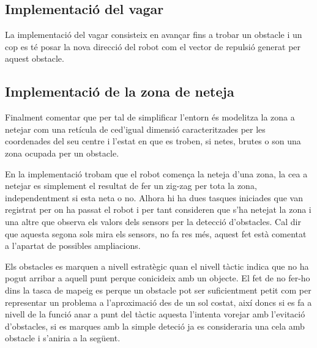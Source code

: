 \subsection{Implementació del vagar}

La implementació del vagar consisteix en avançar fins a trobar un obstacle i un cop es té posar 
la nova direcció del robot com el vector de repulsió generat per aquest obstacle.

\subsection{Implementació de la zona de neteja}

Finalment comentar que per tal de simplificar l'entorn és modelitza la zona a netejar com una retícula
de ce\lgem d'igual dimensió caracteritzades per les coordenades del seu centre i l'estat en que es troben,
si netes, brutes o son una zona ocupada per un obstacle.

En la implementació trobam que el robot comença la neteja d'una zona, la ce\lgem a a netejar es simplement
el resultat de fer un zig-zag per tota la zona, independentment si esta neta o no. Alhora hi ha dues tasques
iniciades que van registrat per on ha passat el robot i per tant consideren que s'ha netejat la zona i una altre
que observa els valors dels sensors per la detecció d'obstacles. Cal dir que aquesta segona sols mira els sensors,
no fa res més, aquest fet està comentat a l'apartat de possibles ampliacions.

Els obstacles es marquen a nivell estratègic quan el nivell tàctic indica que no ha pogut arribar a aquell punt perque conicideix 
amb un objecte. El fet de no fer-ho dins la tasca de mapeig es perque un obstacle pot ser suficientment petit
com per representar un problema a l'aproximació des de un sol costat, així doncs si es fa a nivell de la funció
anar a punt del tàctic aquesta l'intenta vorejar amb l'evitació d'obstacles, si es marques amb la simple deteció
ja es consideraria una cela amb obstacle i s'aniria a la següent.
 